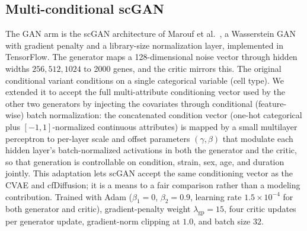 \documentclass[11pt]{article}
\begin{document}
\subsection{Multi-conditional scGAN}
The GAN arm is the scGAN architecture of Marouf et al.\ \cite{scgan}, a Wasserstein GAN with gradient penalty and a library-size normalization layer, implemented in TensorFlow. The generator maps a 128-dimensional noise vector through hidden widths $256,512,1024$ to 2000 genes, and the critic mirrors this. The original conditional variant conditions on a single categorical variable (cell type). We extended it to accept the full multi-attribute conditioning vector used by the other two generators by injecting the covariates through conditional (feature-wise) batch normalization: the concatenated condition vector (one-hot categorical plus $[-1,1]$-normalized continuous attributes) is mapped by a small multilayer perceptron to per-layer scale and offset parameters $(\gamma,\beta)$ that modulate each hidden layer's batch-normalized activations in both the generator and the critic, so that generation is controllable on condition, strain, sex, age, and duration jointly. This adaptation lets scGAN accept the same conditioning vector as the CVAE and cfDiffusion; it is a means to a fair comparison rather than a modeling contribution. Trained with Adam ($\beta_1=0$, $\beta_2=0.9$, learning rate $1.5\times10^{-4}$ for both generator and critic), gradient-penalty weight $\lambda_{\mathrm{gp}}=15$, four critic updates per generator update, gradient-norm clipping at $1.0$, and batch size $32$.
\end{document}
